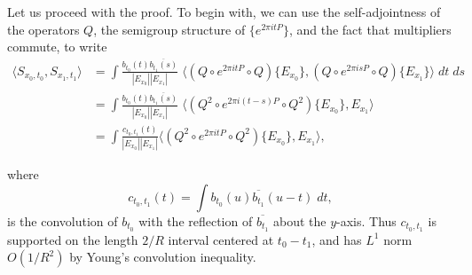 \documentclass[dvipsnames,letterpaper,12pt]{article}
\begin{document}
Let us proceed with the proof. To begin with, we can use the self-adjointness of the operators $Q$, the semigroup structure of $\{ e^{2 \pi i t P} \}$, and the fact that multipliers commute, to write
%
\begin{align*}
    \langle {S\!}_{x_0,t_0}, {S\!}_{x_1,t_1} \rangle &= \int \frac{b_{t_0}(t) \overline{b_{t_1}(s)}}{|E_{x_0}| |E_{x_1}|}\; \Big\langle (Q \circ e^{2 \pi i t P} \circ Q) \{ E_{x_0} \}, (Q \circ e^{2 \pi i s P} \circ Q) \{ E_{x_1} \} \Big\rangle\; dt\; ds\\
    &= \int \frac{b_{t_0}(t) \overline{b_{t_1}(s)}}{|E_{x_0}| |E_{x_1}|}\; \Big\langle (Q^2 \circ e^{2 \pi i (t - s) P} \circ Q^2) \{ E_{x_0} \}, E_{x_1} \Big\rangle\\
    &= \int \frac{c_{t_0,t_1}(t)}{|E_{x_0}||E_{x_1}|} \Big\langle (Q^2 \circ e^{2 \pi i t P} \circ Q^2) \{ E_{x_0} \}, E_{x_1} \Big\rangle,
\end{align*}
%
\begin{comment}

The wave propogators $\{ e^{2 \pi i t P} \}$ form a unitary semigroup. As a result, the Lax parametrix $\{ W(t) \}$ also satisfy the semigroup property \emph{modulo smoothing operators}, i.e. there exists a Schwartz operator $B(t,s)$ whose kernel $B(t,s,x,y)$ is smooth, such that
%
\[ W(s)^* \circ W(t) = W(t - s) + B(t,s). \]
%
This smoothness implies that
%
\[ \| \mathcal{P}_\lambda \{ B(t,s,\cdot,y) \} \|_{L^\infty(S^d)} \lesssim_N \lambda^{-N}, \]
%
and this together with the Weyl Law and the triangle inequality is sufficient to conclude that the kernel $K(t,s,x,y)$ of $Q \circ B(t,s)$ satisfies bounds of the form
%
\[ |K(t,s,x,y)| = \left| \sum \beta(\lambda / R) \mathcal{P}_\lambda \{ B(t,s,\cdot,y) \} \right| \lesssim_N R^{-N}. \]
%
Schur's Lemma, applied to $Q \circ B(t,s)$, together with the uniform boundedness of $Q$, implies that
%
\[ \| (Q \circ B(t,s) \circ Q) \{ E_{x_0} \} \|_{L^2(S^d)} \lesssim_N R^{-N} |E_{x_0}|^{1/2} \]
%
and so Cauchy-Schwartz implies that
%
\begin{align*}
    &\left| \int b_{t_0}(t) \overline{b_{t_1}(s)} \langle (Q \circ B(t,s) \circ Q) \{ E_{x_0} \}, E_{x_1} \rangle\; dt\; ds \right|\\
    &\quad \lesssim_N R^{-N} \int |b_{t_0}(t)| |b_{t_1}(s)| |E_{x_0}|^{1/2} |E_{x_1}|^{1/2}\; dt\; ds\\
    &\quad\lesssim_N C_p(h)^2 R^{-N}.
\end{align*}

\end{comment}
%
where
%
\[ c_{t_0,t_1}(t) = \int b_{t_0}(u) \overline{b_{t_1}}(u - t)\; dt, \]
%
is the convolution of $b_{t_0}$ with the reflection of $\overline{b_{t_1}}$ about the $y$-axis. Thus $c_{t_0,t_1}$ is supported on the length $2/R$ interval centered at $t_0 - t_1$, and has $L^1$ norm $O(1/R^2)$ by Young's convolution inequality.
\end{document}
